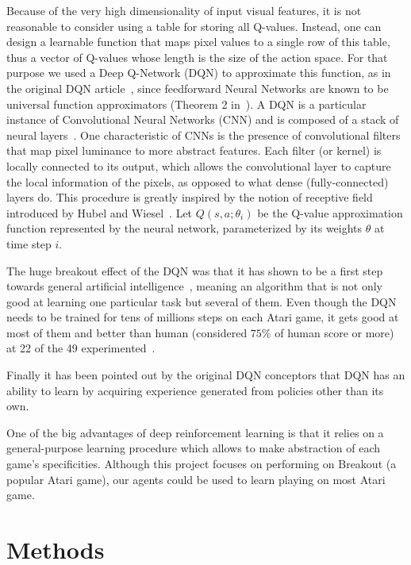 \documentclass[letterpaper]{article}
\begin{document}
Because of the very high dimensionality of input visual features, it is not reasonable to consider using a table for storing all Q-values.
Instead, one can design a learnable function that maps pixel values to a single row of this table, thus a vector of Q-values whose length is the size
of the action space. For that purpose we used a Deep Q-Network (DQN) to approximate this function, as in the original DQN article~\citep{mnih2015human}, since feedforward Neural Networks
are known to be universal function approximators (Theorem 2 in~\cite{hornik1991approximation}).
A DQN is a particular instance of Convolutional Neural Networks (CNN) and is composed of a stack of neural layers~\citep{lecun1998gradient}. One characteristic of CNNs is the
presence of convolutional filters that map pixel luminance to more abstract features. Each filter (or kernel) is locally connected to its output, which
allows the convolutional layer to capture the local information of the pixels, as opposed to what dense (fully-connected) layers do. This procedure is greatly
inspired by the notion of receptive field introduced by Hubel and Wiesel~\citep{Hubel1962}.
Let $Q(s, a; \theta_i)$ be the Q-value approximation function represented by the neural network, parameterized by its weights $\theta$ at time step $i$.

The huge breakout effect of the DQN was that it has shown to be a first step towards general artificial intelligence~\citep{togelius2015ai}, meaning an
algorithm that is not only good at learning one particular task but several of them. Even though the DQN needs to be trained for tens of millions steps
on each Atari game, it gets good at most of them and better than human (considered $75\%$ of human score or more) at 22 of the 49 experimented~\citep{mnih2015human}.

Finally it has been pointed out by the original DQN conceptors that DQN has an ability to learn by acquiring experience generated from policies
other than its own.

One of the big advantages of deep reinforcement learning is that it relies on a general-purpose learning procedure which allows to make
abstraction of each game's specificities. Although this project focuses on performing on Breakout (a popular Atari game),
our agents could be used to learn playing on most Atari game.

\section{Methods}
\end{document}
